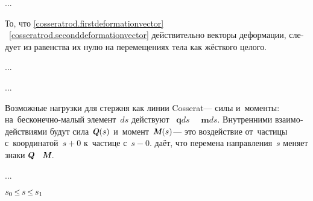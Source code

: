 \begin{otherlanguage}{russian}
...

То, что \eqref{cosseratrod.firstdeformationvector} ~\eqref{cosseratrod.seconddeformationvector} действительно векторы деформации, следует из равенства их нулю на перемещениях тела как жёсткого целого.

...


...


\end{otherlanguage}



\begin{otherlanguage}{russian}

Возможные нагрузки для стержня как линии Cosserat\:--- \hbox{силы} и~моменты: на~бесконечно-малый элемент~$ds$ действуют ~${\bm{q}ds}$ ~~${\bm{m}ds}$.
Внутренними взаимо\-действиями будут сила~${\internalforce(s)}$ и~момент~${\internalmoment(s)}$\:--- это воздействие от~частицы с~координатой~${s\!+\!0}$ к~частице с~${s\!-\!0}$.
 даёт, что перемена направления~$s$ меняет знаки ${\internalforce}$ ~${\internalmoment}$.

...



\end{otherlanguage}



\noindent
{} ${s_0 \hspace{.2em} \scalebox{0.9}{$\leq$} \hspace{.18em} s \hspace{.22em} \scalebox{0.9}{$\leq$} \hspace{.2em} s_1}$ 

